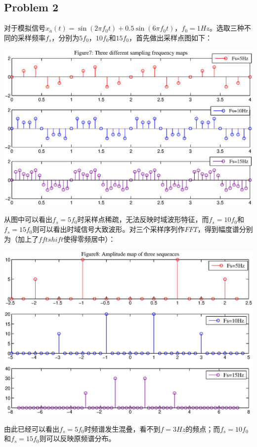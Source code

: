 \documentclass[a4paper,11pt,onecolumn,twoside]{article}
\begin{document}
\subsection{Problem 2}
对于模拟信号$x_a(t)=\sin(2\pi f_0t)+0.5\sin(6\pi f_0t)$，$f_0=1Hz$。选取三种不同的采样频率$f_s$，分别为$5f_0$，$10f_0$和$15f_0$，首先做出采样点图如下：
\begin{center}
    \includegraphics[width=1\textwidth]{fig7.eps}
\end{center}
从图中可以看出$f_s=5f_0$时采样点稀疏，无法反映时域波形特征，而$f_s=10f_0$和$f_s=15f_0$则可以看出时域信号大致波形。对三个采样序列作$FFT$，得到幅度谱分别为（加上了$fftshift$使得零频居中）：
\begin{center}
    \includegraphics[width=1\textwidth]{fig8.eps}
\end{center}
由此已经可以看出$f_s=5f_0$时频谱发生混叠，看不到$f=3Hz$的频点；而$f_s=10f_0$和$f_s=15f_0$则可以反映原频谱分布。
\end{document}
